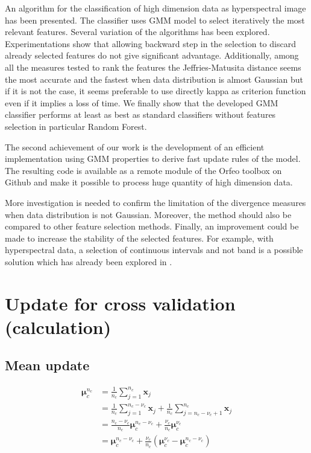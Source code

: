 \documentclass[a4paper,11pt,DIV=16,abstracton]{scrartcl}
\begin{document}
An algorithm for the classification of high dimension data as hyperspectral image has been presented. The classifier uses GMM model to select iteratively the most relevant features. Several variation of the algorithms has been explored. Experimentations show that allowing backward step in the selection to discard already selected features do not give significant advantage. Additionally, among all the measures tested to rank the features the Jeffries-Matusita distance seems the most accurate and the fastest when data distribution is almost Gaussian but if it is not the case, it seems preferable to use directly kappa as criterion function even if it implies a loss of time. We finally show that the developed GMM classifier performs at least as best as standard classifiers without features selection in particular Random Forest.

The second achievement of our work is the development of an efficient implementation using GMM properties to derive fast update rules of the model. The resulting code is available as a remote module of the Orfeo toolbox on Github and make it possible to process huge quantity of high dimension data.

More investigation is needed to confirm the limitation of the divergence measures when data distribution is not Gaussian. Moreover, the method should also be compared to other feature selection methods. Finally, an improvement could be made to increase the stability of the selected features. For example, with hyperspectral data, a selection of continuous intervals and not band is a possible solution which has already been explored in \cite{serpico2007extraction}.

\newpage

\appendix
\section{Update for cross validation (calculation)}
\label{app:cv_maj}

    \subsection{Mean update}
        \begin{align*}
            \boldsymbol{\mu}_c^{n_c} &= \frac{1}{n_c} \sum_{j = 1}^{n_c} \mathbf{x}_j \\
                        &= \frac{1}{n_c} \sum_{j = 1}^{n_c-\nu_c} \mathbf{x}_j + \frac{1}{n_c} \sum_{j = n_c-\nu_c +1}^{n_c} \mathbf{x}_j \\
                        &= \frac{n_c-\nu_c}{n_c} \boldsymbol{\mu}_c^{n_c-\nu_c} + \frac{\nu_c}{n_c} \boldsymbol{\mu}_c^{\nu_c} \\
                        &= \boldsymbol{\mu}_c^{n_c-\nu_c} + \frac{\nu_c}{n_c} (\boldsymbol{\mu}_c^{\nu_c} - \boldsymbol{\mu}_c^{n_c-\nu_c})
        \end{align*}
\end{document}

